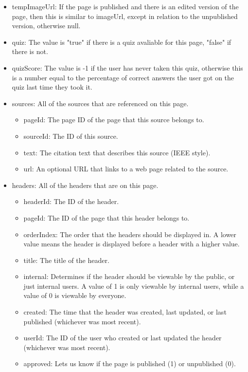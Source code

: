 \documentclass[onecolumn, draftclsnofoot,10pt, compsoc, usenames, dvipsnames]{IEEEtran}
\begin{document}
\begin{itemize}
    \item tempImageUrl: If the page is published and there is an edited version of the page, then this is similar to imageUrl, except in relation to the unpublished version, otherwise null.
    \item quiz: The value is "true" if there is a quiz avaliable for this page, "false" if there is not.
    \item quizScore: The value is -1 if the user has never taken this quiz, otherwise this is a number equal to the percentage of correct answers the user got on the quiz last time they took it.
    \item sources: All of the sources that are referenced on this page.
        \begin{itemize}
            \item pageId: The page ID of the page that this source belongs to.
            \item sourceId: The ID of this source.
            \item text: The citation text that describes this source (IEEE style).
            \item url: An optional URL that links to a web page related to the source.
        \end{itemize}
    \item headers: All of the headers that are on this page.
        \begin{itemize}
            \item headerId: The ID of the header.
            \item pageId: The ID of the page that this header belongs to.
            \item orderIndex: The order that the headers should be displayed in. A lower value means the header is displayed before a header with a higher value.
            \item title: The title of the header.
            \item internal: Determines if the header should be viewable by the public, or just internal users. A value of 1 is only viewable by internal users, while a value of 0 is viewable by everyone.
            \item created: The time that the header was created, last updated, or last published (whichever was most recent).
            \item userId: The ID of the user who created or last updated the header (whichever was most recent).
            \item approved: Lets us know if the page is published (1) or unpublished (0).

\end{itemize}
\end{itemize}
\end{document}
